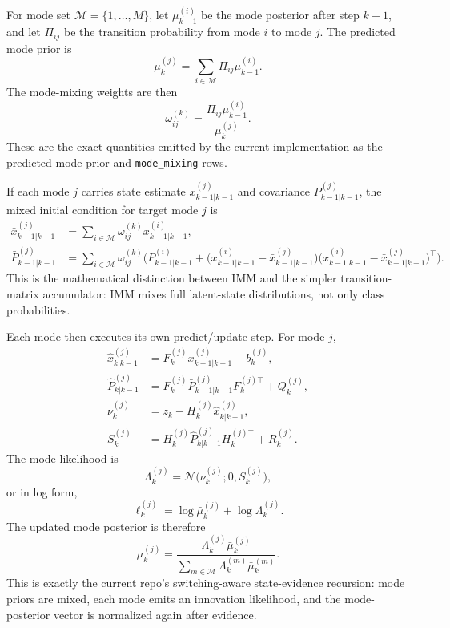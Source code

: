 \documentclass[11pt]{article}
\begin{document}
For mode set \(\mathcal{M} = \{1,\dots,M\}\), let \(\mu_{k-1}^{(i)}\) be the
mode posterior after step \(k-1\), and let \(\Pi_{ij}\) be the transition
probability from mode \(i\) to mode \(j\). The predicted mode prior is
\begin{equation}
\bar{\mu}_{k}^{(j)}
=
\sum_{i \in \mathcal{M}}
\Pi_{ij}\mu_{k-1}^{(i)}.
\end{equation}
The mode-mixing weights are then
\begin{equation}
\omega_{ij}^{(k)}
=
\frac{\Pi_{ij}\mu_{k-1}^{(i)}}{\bar{\mu}_{k}^{(j)}}.
\end{equation}
These are the exact quantities emitted by the current implementation as the
predicted mode prior and \texttt{mode\_mixing} rows.

If each mode \(j\) carries state estimate \(x_{k-1|k-1}^{(j)}\) and covariance
\(P_{k-1|k-1}^{(j)}\), the mixed initial condition for target mode \(j\) is
\begin{align}
\bar{x}_{k-1|k-1}^{(j)}
&=
\sum_{i \in \mathcal{M}}
\omega_{ij}^{(k)} x_{k-1|k-1}^{(i)},
\\
\bar{P}_{k-1|k-1}^{(j)}
&=
\sum_{i \in \mathcal{M}}
\omega_{ij}^{(k)}
\Big(
P_{k-1|k-1}^{(i)}
+
\big(x_{k-1|k-1}^{(i)}-\bar{x}_{k-1|k-1}^{(j)}\big)
\big(x_{k-1|k-1}^{(i)}-\bar{x}_{k-1|k-1}^{(j)}\big)^\top
\Big).
\end{align}
This is the mathematical distinction between IMM and the simpler
transition-matrix accumulator: IMM mixes full latent-state distributions, not
only class probabilities.

Each mode then executes its own predict/update step. For mode \(j\),
\begin{align}
\hat{x}_{k|k-1}^{(j)}
&=
F_k^{(j)}\bar{x}_{k-1|k-1}^{(j)} + b_k^{(j)},
\\
\hat{P}_{k|k-1}^{(j)}
&=
F_k^{(j)}\bar{P}_{k-1|k-1}^{(j)}F_k^{(j)\top} + Q_k^{(j)},
\\
\nu_k^{(j)}
&=
z_k - H_k^{(j)}\hat{x}_{k|k-1}^{(j)},
\\
S_k^{(j)}
&=
H_k^{(j)}\hat{P}_{k|k-1}^{(j)}H_k^{(j)\top} + R_k^{(j)}.
\end{align}
The mode likelihood is
\begin{equation}
\Lambda_k^{(j)}
=
\mathcal{N}\!\big(\nu_k^{(j)}; 0, S_k^{(j)}\big),
\end{equation}
or in log form,
\begin{equation}
\ell_k^{(j)}
=
\log \bar{\mu}_k^{(j)} + \log \Lambda_k^{(j)}.
\end{equation}
The updated mode posterior is therefore
\begin{equation}
\mu_k^{(j)}
=
\frac{\Lambda_k^{(j)}\bar{\mu}_k^{(j)}}{\sum_{m \in \mathcal{M}} \Lambda_k^{(m)}\bar{\mu}_k^{(m)}}.
\end{equation}
This is exactly the current repo's switching-aware state-evidence recursion:
mode priors are mixed, each mode emits an innovation likelihood, and the
mode-posterior vector is normalized again after evidence.
\end{document}
